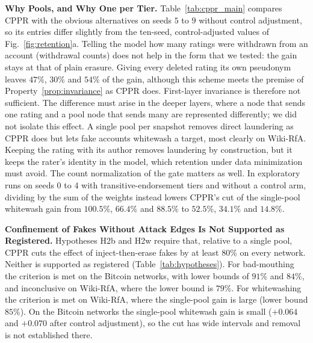 \documentclass[lettersize,journal]{IEEEtran}
\begin{document}
\smallskip\noindent\textbf{Why Pools, and Why One per Tier.}
Table~\ref{tab:cppr_main} compares CPPR with the obvious alternatives on seeds $5$ to $9$ without control adjustment, so its entries differ slightly from the ten-seed, control-adjusted values of Fig.~\ref{fig:retention}a.
Telling the model how many ratings were withdrawn from an account (withdrawal counts) does not help in the form that we tested: the gain stays at that of plain erasure.
Giving every deleted rating its own pseudonym leaves $47\%$, $30\%$ and $54\%$ of the gain, although this scheme meets the premise of Property~\ref{prop:invariance} as CPPR does.
First-layer invariance is therefore not sufficient. The difference must arise in the deeper layers, where a node that sends one rating and a pool node that sends many are represented differently; we did not isolate this effect.
A single pool per snapshot removes direct laundering as CPPR does but lets fake accounts whitewash a target, most clearly on Wiki-RfA.
Keeping the rating with its author removes laundering by construction, but it keeps the rater's identity in the model, which retention under data minimization must avoid.
The count normalization of the gate matters as well.
In exploratory runs on seeds $0$ to $4$ with transitive-endorsement tiers and without a control arm, dividing by the sum of the weights instead lowers CPPR's cut of the single-pool whitewash gain from $100.5\%$, $66.4\%$ and $88.5\%$ to $52.5\%$, $34.1\%$ and $14.8\%$.

\smallskip\noindent\textbf{Confinement of Fakes Without Attack Edges Is Not Supported as Registered.}
Hypotheses H2b and H2w require that, relative to a single pool, CPPR cuts the effect of inject-then-erase fakes by at least $80\%$ on every network. Neither is supported as registered (Table~\ref{tab:hypotheses}).
For bad-mouthing the criterion is met on the Bitcoin networks, with lower bounds of $91\%$ and $84\%$, and inconclusive on Wiki-RfA, where the lower bound is $79\%$.
For whitewashing the criterion is met on Wiki-RfA, where the single-pool gain is large (lower bound $85\%$).
On the Bitcoin networks the single-pool whitewash gain is small ($+0.064$ and $+0.070$ after control adjustment), so the cut has wide intervals and removal is not established there.
\end{document}
